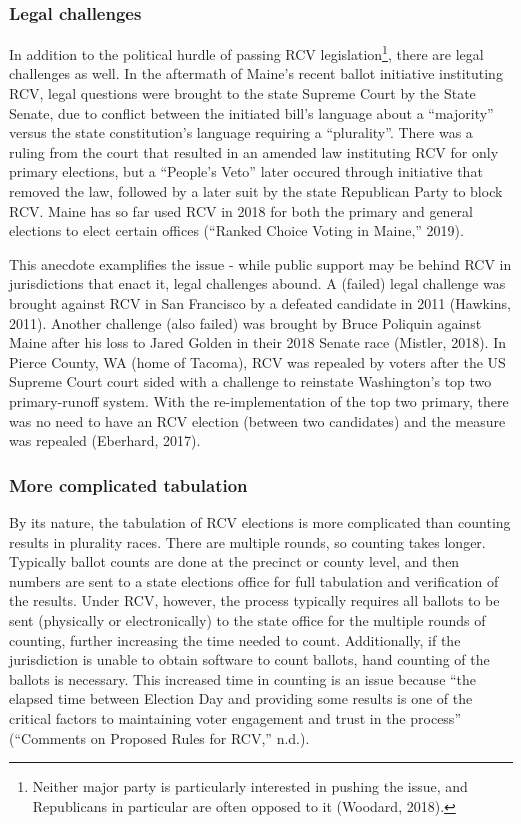 \documentclass[12pt,twoside]{reedthesis}
\begin{document}
\hypertarget{legal-challenges}{%
\subsubsection{Legal challenges}\label{legal-challenges}}

In addition to the political hurdle of passing RCV legislation\footnote{Neither major party is particularly interested in pushing the issue, and Republicans in particular are often opposed to it (Woodard, 2018).}, there are legal challenges as well. In the aftermath of Maine's recent ballot initiative instituting RCV, legal questions were brought to the state Supreme Court by the State Senate, due to conflict between the initiated bill's language about a ``majority'' versus the state constitution's language requiring a ``plurality''. There was a ruling from the court that resulted in an amended law instituting RCV for only primary elections, but a ``People's Veto'' later occured through initiative that removed the law, followed by a later suit by the state Republican Party to block RCV. Maine has so far used RCV in 2018 for both the primary and general elections to elect certain offices (``Ranked Choice Voting in Maine,'' 2019).

This anecdote examplifies the issue - while public support may be behind RCV in jurisdictions that enact it, legal challenges abound. A (failed) legal challenge was brought against RCV in San Francisco by a defeated candidate in 2011 (Hawkins, 2011). Another challenge (also failed) was brought by Bruce Poliquin against Maine after his loss to Jared Golden in their 2018 Senate race (Mistler, 2018). In Pierce County, WA (home of Tacoma), RCV was repealed by voters after the US Supreme Court court sided with a challenge to reinstate Washington's top two primary-runoff system. With the re-implementation of the top two primary, there was no need to have an RCV election (between two candidates) and the measure was repealed (Eberhard, 2017).

\hypertarget{more-complicated-tabulation}{%
\subsubsection{More complicated tabulation}\label{more-complicated-tabulation}}

By its nature, the tabulation of RCV elections is more complicated than counting results in plurality races. There are multiple rounds, so counting takes longer. Typically ballot counts are done at the precinct or county level, and then numbers are sent to a state elections office for full tabulation and verification of the results. Under RCV, however, the process typically requires all ballots to be sent (physically or electronically) to the state office for the multiple rounds of counting, further increasing the time needed to count. Additionally, if the jurisdiction is unable to obtain software to count ballots, hand counting of the ballots is necessary. This increased time in counting is an issue because ``the elapsed time between Election Day and providing some results is one of the critical factors to maintaining voter engagement and trust in the process'' (``Comments on Proposed Rules for RCV,'' n.d.).
\end{document}
